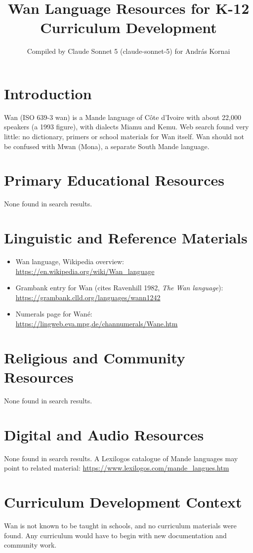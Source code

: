 \documentclass[12pt]{article}
\title{Wan Language Resources for K-12 Curriculum Development}
\author{Compiled by Claude Sonnet 5 (claude-sonnet-5) for Andr\'as Kornai}
\date{}
\begin{document}
\maketitle
\section{Introduction}
Wan (ISO 639-3 wan) is a Mande language of C\^ote d'Ivoire with about 22,000 speakers (a 1993 figure), with dialects Miamu and Kemu. Web search found very little: no dictionary, primers or school materials for Wan itself. Wan should not be confused with Mwan (Mona), a separate South Mande language.
\section{Primary Educational Resources}
None found in search results.
\section{Linguistic and Reference Materials}
\begin{itemize}
\item Wan language, Wikipedia overview: \url{https://en.wikipedia.org/wiki/Wan_language}
\item Grambank entry for Wan (cites Ravenhill 1982, \emph{The Wan language}): \url{https://grambank.clld.org/languages/wann1242}
\item Numerals page for Wan\'e: \url{https://lingweb.eva.mpg.de/channumerals/Wane.htm}
\end{itemize}
\section{Religious and Community Resources}
None found in search results.
\section{Digital and Audio Resources}
None found in search results. A Lexilogos catalogue of Mande languages may point to related material: \url{https://www.lexilogos.com/mande_langues.htm}
\section{Curriculum Development Context}
Wan is not known to be taught in schools, and no curriculum materials were found. Any curriculum would have to begin with new documentation and community work.
\end{document}
